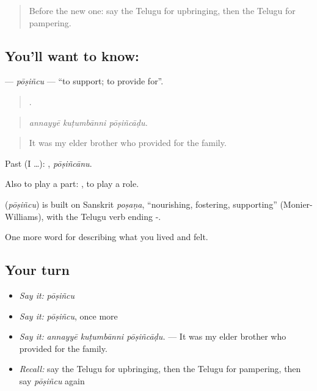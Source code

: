 \label{lesson:TE-C532-posincu}



\begin{quote}
Before the new one: say the Telugu for upbringing, then the Telugu for pampering.
\end{quote}

\subsection*{You'll want to know: }
\textbf{} — \emph{pōṣiñcu} — \textquotedblleft{}to support; to provide for\textquotedblright{}.

\begin{quote}
  .
\end{quote}

\begin{quote}
\emph{annayyē kuṭumbānni pōṣiñcāḍu.}
\end{quote}

\begin{quote}
It was my elder brother who provided for the family.
\end{quote}

Past (I …): , \emph{pōṣiñcānu}.

Also to play a part:  , to play a role.

\begin{cousinweb}
\textbf{} (\emph{pōṣiñcu}) is built on Sanskrit \emph{poṣaṇa}, \textquotedblleft{}nourishing, fostering, supporting\textquotedblright{} (Monier-Williams), with the Telugu verb ending -.
\end{cousinweb}

\begin{grammarlens}[title={What you've built}]
One more word for describing what you lived and felt.
\end{grammarlens}

\subsection*{Your turn}
\begin{itemize}
\raggedright
  \item \emph{Say it:} \emph{pōṣiñcu}
  \item \emph{Say it:} \emph{pōṣiñcu}, once more
  \item \emph{Say it:} \emph{annayyē kuṭumbānni pōṣiñcāḍu.} — It was my elder brother who provided for the family.
  \item \emph{Recall:} say the Telugu for upbringing, then the Telugu for pampering, then say \emph{pōṣiñcu} again
\end{itemize}

